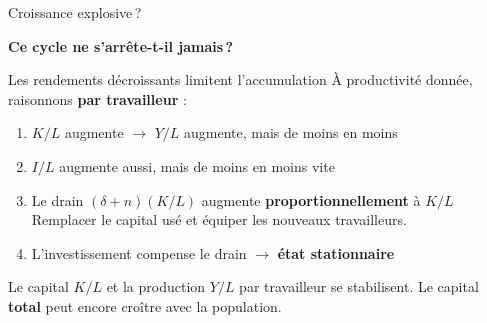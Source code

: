 \documentclass[aspectratio=169]{beamer}
\begin{document}
\begin{frame}{Croissance explosive\,?}
   \vspace{0.2cm}
   \centering
   \vspace{0.3cm}

   {\large \textcolor{HECcoral}{\textbf{Ce cycle ne s'arrête-t-il jamais\,?}}}
\end{frame}

\begin{frame}[t]{Les rendements décroissants limitent l'accumulation}\examtag
   À productivité donnée, raisonnons \textbf{par travailleur} :
   \vspace{0.2cm}
   \begin{enumerate}
      \setlength\itemsep{0.2cm}
      \item $K / L$ augmente $\to$ $Y / L$ augmente, mais de moins en moins
      \item $I / L$ augmente aussi, mais de moins en moins vite
      \item Le drain $(\delta + n) (K / L)$ augmente \textbf{proportionnellement} à $K / L$ \\
      \textcolor{HECgray}{Remplacer le capital usé et équiper les nouveaux travailleurs.}
      \item L'investissement compense le drain $\to$ \textbf{état stationnaire}
   \end{enumerate}
   \vspace{0.2cm}
   \begin{defbox}
      Le capital $K / L$ et la production $Y / L$ par travailleur se stabilisent. Le capital \textbf{total} peut encore croître avec la population.
   \end{defbox}
\end{frame}
\end{document}
